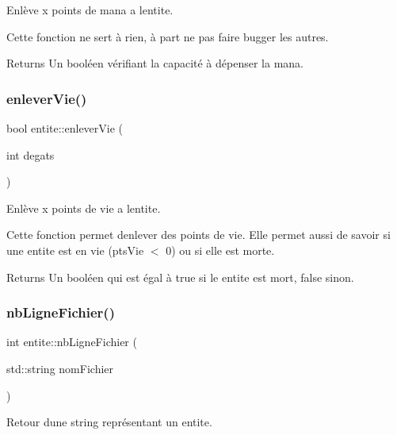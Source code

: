 Enlève x points de mana a l\textquotesingle{}entite. 

Cette fonction ne sert à rien, à part ne pas faire bugger les autres. \begin{DoxyReturn}{Returns}
Un booléen vérifiant la capacité à dépenser la mana. 
\end{DoxyReturn}
\mbox{\label{classentite_a024cbcffabd07556d550f5941f2113d4}} 
\subsubsection{\texorpdfstring{enlever\+Vie()}{enleverVie()}}
{\footnotesize\ttfamily bool entite\+::enlever\+Vie (\begin{DoxyParamCaption}\item[{int}]{degats }\end{DoxyParamCaption})}



Enlève x points de vie a l\textquotesingle{}entite. 

Cette fonction permet d\textquotesingle{}enlever des points de vie. Elle permet aussi de savoir si une entite est en vie (pts\+Vie $<$ 0) ou si elle est morte. \begin{DoxyReturn}{Returns}
Un booléen qui est égal à {\ttfamily true} si le entite est mort, {\ttfamily false} sinon. 
\end{DoxyReturn}
\mbox{\label{classentite_a983d51dcdfaaddaf95096587ea33a3ec}} 
\subsubsection{\texorpdfstring{nb\+Ligne\+Fichier()}{nbLigneFichier()}}
{\footnotesize\ttfamily int entite\+::nb\+Ligne\+Fichier (\begin{DoxyParamCaption}\item[{std\+::string}]{nom\+Fichier }\end{DoxyParamCaption})}



Retour d\textquotesingle{}une string représentant un entite. 

